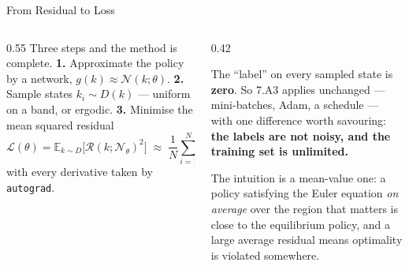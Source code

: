 \begin{frame}{From Residual to Loss}
\begin{columns}[T]
\begin{column}{0.55\textwidth}
\small
Three steps and the method is complete.
\smallskip
\textbf{1.} Approximate the policy by a network, $g(k)\approx\mathcal{N}(k;\theta)$.
\smallskip
\textbf{2.} Sample states $k_i\sim D(k)$ --- uniform on a band, or ergodic.
\smallskip
\textbf{3.} Minimise the mean squared residual
\[
  \mathcal{L}(\theta)=\mathbb{E}_{k\sim D}\bigl[\mathcal{R}(k;\mathcal{N}_\theta)^{2}\bigr]
  \;\approx\;\frac{1}{N}\sum_{i=1}^{N}\mathcal{R}(k_i;\mathcal{N}_\theta)^{2},
\]
with every derivative taken by \texttt{autograd}.
\end{column}
\begin{column}{0.42\textwidth}
\begin{takeawaybox}[title=\textbf{It is supervised learning}]\small
The ``label'' on every sampled state is \textbf{zero}. So 7.A3 applies unchanged --- mini-batches, Adam, a schedule --- with one difference worth savouring: \textbf{the labels are not noisy, and the training set is unlimited.}
\end{takeawaybox}
\smallskip
{\footnotesize The intuition is a mean-value one: a policy satisfying the Euler equation \emph{on average} over the region that matters is close to the equilibrium policy, and a large average residual means optimality is violated somewhere.}
\end{column}
\end{columns}
\end{frame}

